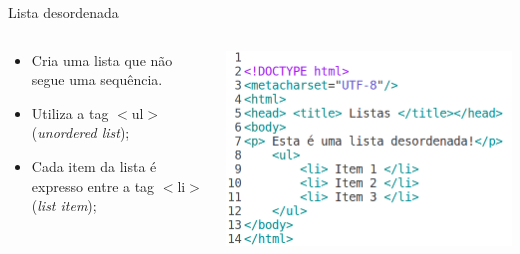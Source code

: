 \documentclass{beamer}
\begin{document}
\begin{frame}{Lista desordenada}
  \begin{columns}
    \begin{column}{0.45 \textwidth}
     \begin{itemize}
      \item Cria uma lista que não segue uma sequência.
       \item Utiliza a tag $<$ul$>$ (\textit{unordered list});
       \item Cada item da lista é expresso entre a tag $<$li$>$ 
      (\textit{list item});
     \end{itemize}
    \end{column}
    \begin{column}{0.5\textwidth}
     \includegraphics[height=0.45\paperheight]{fig/aula2/html3.png}
    \end{column}
  \end{columns}
\end{frame}
\end{document}
